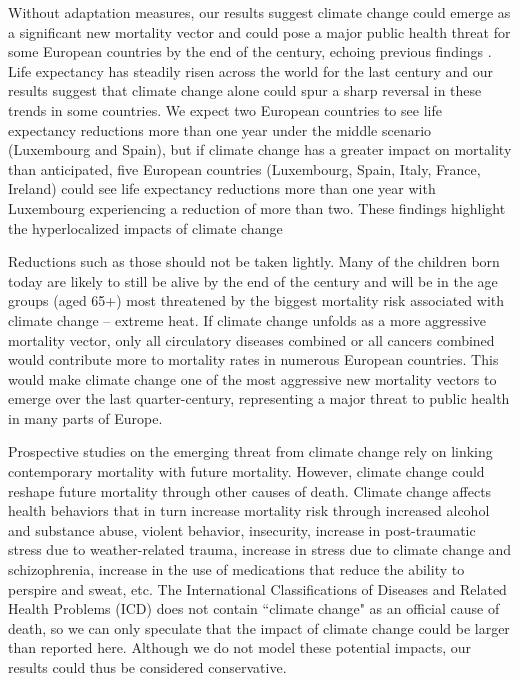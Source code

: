 \documentclass[12pt,]{article}
\begin{document}
Without adaptation measures, our results suggest climate change could
emerge as a significant new mortality vector and could pose a major
public health threat for some European countries by the end of the
century, echoing previous findings
\citep{forzieri2017increasing, patz2005impact}. Life expectancy has
steadily risen across the world for the last century
\citep{gerland2014world} and our results suggest that climate change
alone could spur a sharp reversal in these trends in some countries. We
expect two European countries to see life expectancy reductions more
than one year under the middle scenario (Luxembourg and Spain), but if
climate change has a greater impact on mortality than anticipated, five
European countries (Luxembourg, Spain, Italy, France, Ireland) could see
life expectancy reductions more than one year with Luxembourg
experiencing a reduction of more than two. These findings highlight the
hyperlocalized impacts of climate change
\citep{kendon2014heavier, rosenzweig2010cities, forzieri2017increasing}

Reductions such as those should not be taken lightly. Many of the
children born today are likely to still be alive by the end of the
century and will be in the age groups (aged 65+) most threatened by the
biggest mortality risk associated with climate change
\citep{keatinge2000heat} -- extreme heat. If climate change unfolds as a
more aggressive mortality vector, only all circulatory diseases combined
or all cancers combined would contribute more to mortality rates in
numerous European countries. This would make climate change one of the
most aggressive new mortality vectors to emerge over the last
quarter-century, representing a major threat to public health in many
parts of Europe.

Prospective studies on the emerging threat from climate change rely on
linking contemporary mortality with future mortality. However, climate
change could reshape future mortality through other causes of death.
Climate change affects health behaviors that in turn increase mortality
risk through increased alcohol and substance abuse, violent behavior,
insecurity, increase in post-traumatic stress due to weather-related
trauma, increase in stress due to climate change and schizophrenia,
increase in the use of medications that reduce the ability to perspire
and sweat, etc. \citep{patz2005impact} The International Classifications
of Diseases and Related Health Problems (ICD) does not contain ``climate
change" as an official cause of death, so we can only speculate that the
impact of climate change could be larger than reported here. Although we
do not model these potential impacts, our results could thus be
considered conservative.
\end{document}
